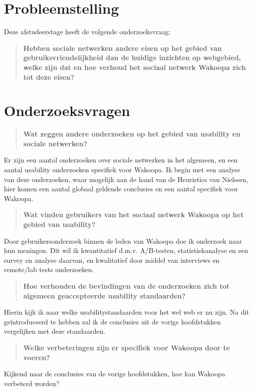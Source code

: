 \documentclass[a4paper, 10pt, twoside, pdftex]{article}
\begin{document}
\section{Probleemstelling}
Deze afstudeerstage heeft de volgende onderzoeksvraag:
\begin{quote}
 \textbf{Hebben sociale netwerken andere eisen op het gebied van gebruiksvriendelijkheid dan de huidige inzichten op webgebied, welke zijn dat en hoe verhoud het sociaal netwerk Wakoopa zich tot deze eisen?}
\end{quote}


\section{Onderzoeksvragen}
\begin{quote}
 \textbf{Wat zeggen andere onderzoeken op het gebied van usability en sociale netwerken?}
\end{quote}
Er zijn een aantal onderzoeken over sociale netwerken in het algemeen, en een aantal usability onderzoeken specifiek voor Wakoopa. Ik begin met een analyse van deze onderzoeken, waar mogelijk aan de hand van de Heuristics van Nielssen, hier komen een aantal globaal geldende conclusies en een aantal specifiek voor Wakoopa.

\begin{quote}
\textbf{Wat vinden gebruikers van het sociaal netwerk Wakoopa op het gebied van usability?}
\end{quote}
Door gebruikersonderzoek binnen de leden van Wakoopa doe ik onderzoek naar hun meningen. Dit wil ik kwantitatief d.m.v. A/B-testen, statistiekanalyse en een survey en analyse daarvan, en kwalitatief door middel van interviews en remote/lab tests onderzoeken.


\begin{quote}
\textbf{Hoe verhouden de bevindingen van de onderzoeken zich tot algemeen geaccepteerde usability standaarden?}
\end{quote}
Hierin kijk ik naar welke usabilitystandaarden voor het wel web er nu zijn. Na dit ge\"{i}ntroduceerd te hebben zal ik de conclusies uit de vorige hoofdstukken vergelijken met deze standaarden.


\begin{quote}
\textbf{Welke verbeteringen zijn er specifiek voor Wakoopa door te voeren?}
\end{quote}
Kijkend naar de conclusies van de vorige hoofdstukken, hoe kan Wakoopa verbeterd worden?
\end{document}
